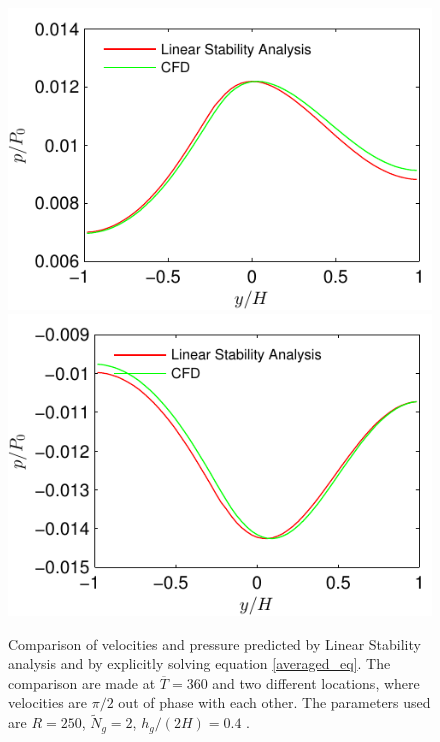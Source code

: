 \documentclass[12pt]{report}   %
\newcommand{\Ndg}{\tilde{N}_g}
\renewcommand{\bar}{\overline}
\begin{document}
\begin{figure}
\centerline{\includegraphics{LinearStabilityVsCFD_p_phase0} \includegraphics{LinearStabilityVsCFD_p_phase90}}
\caption [Comparison of velocities and pressure predicted by Linear Stability analysis and by explicitly solving equation \eqref{averaged_eq}. ]{Comparison of velocities and pressure predicted by Linear Stability analysis and by explicitly solving equation \eqref{averaged_eq}. The comparison are made at $\bar{T}=360$ and two different locations, where velocities are $\pi/2$ out of phase with each other. The parameters used are $R=250$, $\Ndg=2$, $h_g/(2H)=0.4$   .}
\label{CFD_vs_LinearStability_AllVariables}
\end{figure}
\clearpage{\pagestyle{empty}\cleardoublepage}
\end{document}

